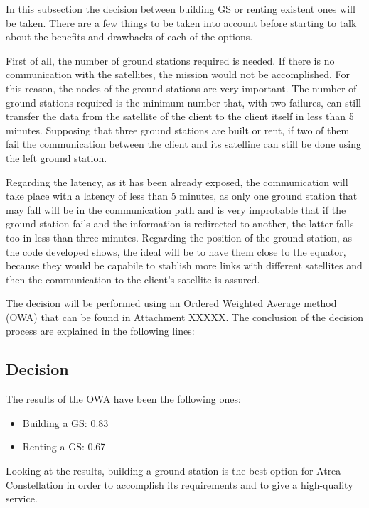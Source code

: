 In this subsection the decision between building GS or renting existent ones will be taken. There are a few things to be taken into account before starting to talk about the benefits and drawbacks of each of the options.

First of all, the number of ground stations required is needed. If there is no communication with the satellites, the mission would not be accomplished. For this reason, the nodes of the ground stations are very important. The number of ground stations required is the minimum number that, with two failures, can still transfer the data from the satellite of the client to the client itself in less than 5 minutes. Supposing that three ground stations are built or rent, if two of them fail the communication between the client and its satelline can still be done using the left ground station.

Regarding the latency, as it has been already exposed, the communication will take place with a latency of less than 5 minutes, as only one ground station that may fall will be in the communication path and is very improbable that if the ground station fails and the information is redirected to another, the latter falls too in less than three minutes. Regarding the position of the ground station, as the code developed shows, the ideal will be to have them close to the equator, because they would be capabile to stablish more links with different satellites and then the communication to the client's satellite is assured.

The decision will be performed using an Ordered Weighted Average method (OWA) that can be found in Attachment XXXXX. The conclusion of the decision process are explained in the following lines:

\subsection{Decision}
The results of the OWA have been the following ones:
\begin{itemize}
\item Building a GS: 0.83
\item Renting a GS: 0.67
\end{itemize}

Looking at the results, building a ground station is the best option for Atrea Constellation in order to accomplish its requirements and to give a high-quality service.